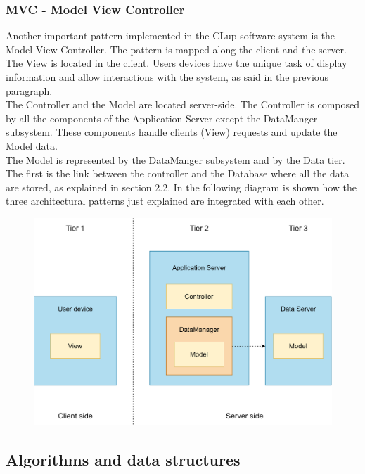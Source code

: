 \documentclass[]{article}
\begin{document}
	\subsubsection{MVC - Model View Controller}
	Another important pattern implemented in the CLup software system is the Model-View-Controller.
	The pattern is mapped along the client and the server. 
	The View is located in the client. Users devices have the unique task of display information and allow interactions with the system, as said in the previous paragraph.
	\\The Controller and the Model are located server-side.
	The Controller is composed by all the components of the Application Server except the DataManger subsystem. These components handle clients (View) requests and update the Model data. 
	\\The Model is represented by the DataManger subsystem and by the Data tier. The first is the link between the controller and the Database where all the data are stored, as explained in section 2.2.
	\newline
	\newline
	\newline
	In the following diagram is shown how the three architectural patterns just explained are integrated with each other.
	\bigskip
	\begin{figure}[H]
		\centering
		\includegraphics[scale=0.8]{MVC}
		\caption{}
	\end{figure}
	
	
	\subsection{Algorithms and data structures}
\end{document}

